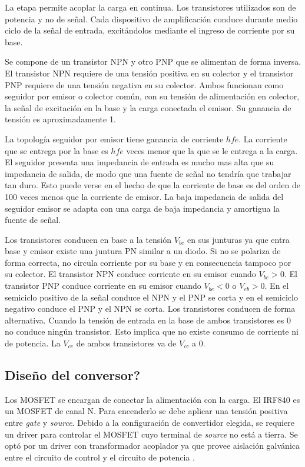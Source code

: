 La etapa permite acoplar la carga en continua. 
Los transistores utilizados son de potencia y no de señal. 
Cada dispositivo de amplificación conduce durante medio ciclo de la señal de entrada, 
excitándolos mediante el ingreso de corriente por su base.

Se compone de un transistor NPN y otro PNP que se alimentan de forma inversa.
El transistor NPN requiere de una tensión positiva en su colector y 
el transistor PNP requiere de una tensión negativa en su colector.
Ambos funcionan como seguidor por emisor o colector común, con su tensión de alimentación en colector, la señal de excitación en la base y la carga conectada el emisor. 
Su ganancia de tensión es aproximadamente 1.

La topología seguidor por emisor tiene ganancia de corriente $hfe$. 
La corriente que se entrega por la base es $hfe$ veces menor que la que se le entrega a la carga. 
El seguidor presenta una impedancia de entrada es mucho mas alta que su impedancia de salida, de modo que una fuente de señal no tendría que trabajar tan duro.
Esto puede verse en el hecho de que la corriente de base es del orden de 100 veces menos que la corriente de emisor. 
La baja impedancia de salida del seguidor emisor se adapta con una carga de baja impedancia y amortigua la fuente de señal.

Los transistores conducen en base a la tensión $V_{be}$ en sus junturas ya que entra base y emisor existe una juntura PN similar a un diodo. 
Si no se polariza de forma correcta, no circula corriente por su base y en consecuencia tampoco por su colector. 
El transistor NPN conduce corriente en su emisor cuando $V_{be}>0$. 
El transistor PNP conduce corriente en su emisor cuando $V_{be}<0$ o $V_{eb}>0$.
En el semiciclo positivo de la señal conduce el NPN y el PNP se corta y en el semiciclo negativo conduce el PNP y el NPN se corta. 
Los transistores conducen de forma alternativa.
Cuando la tensión de entrada en la base de ambos transistores es 0 no conduce ningún transistor. 
Esto implica que no existe consumo de corriente ni de potencia. 
La $V_{ce}$ de ambos transistores va de $V_{cc}$ a 0.

\subsection{Diseño del conversor?}

Los MOSFET se encargan de conectar la alimentación con la carga. El IRF840 es un MOSFET de canal N.
Para encenderlo se debe aplicar una tensión positiva entre \textit{gate} y \textit{source}. 
Debido a la configuración de convertidor elegida, se requiere un driver para controlar el MOSFET cuyo terminal de \textit{source} no está a tierra. Se optó por un driver con transformador acoplador ya que provee aislación galvánica entre el circuito de control y el circuito de potencia \cite{gatedrivers}.

